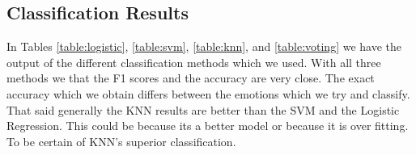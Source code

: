 \subsection{Classification Results}

In Tables \ref{table:logistic}, \ref{table:svm}, \ref{table:knn}, and \ref{table:voting}
we have the output of the different classification methods which we used.
With all three methods we that the F1 scores and the accuracy are very close.
The exact accuracy which we obtain differs between the emotions which we try and classify.
That said generally the KNN results are better than the SVM and the Logistic Regression.
This could be because its a better model or because it is over fitting.
To be certain of KNN's superior classification.
